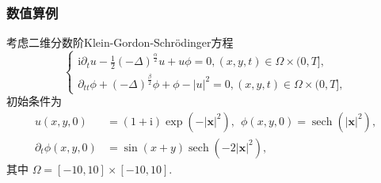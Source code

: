 \documentclass[aspectratio=169]{beamer}
\numberwithin{theorem}{section} %
\begin{document}
\begin{frame}\frametitle{数值算例}
	\begin{example}\label{exp_SAVRRK:4}
		考虑二维分数阶Klein-Gordon-Schr{\"o}dinger方程\cite{fuStructurepreservingAlgorithmsTwodimensional2020} 
		\begin{equation}
		\begin{cases}
		\mathrm{i} \partial_t u-\frac{1}{2}(-\Delta)^{\frac{\alpha}{2}} u+u \phi=0,(x, y, t) \in \Omega \times(0, T],\\
		\partial_{t t} \phi+(-\Delta)^{\frac{\beta}{2}} \phi+\phi-|u|^2=0, (x, y, t) \in \Omega \times(0, T],
		\end{cases}
		\end{equation}
		初始条件为
		\begin{equation}
			\begin{aligned}
				u(x, y, 0)&=(1+\mathrm{i}) \exp \left(-|\boldsymbol{x}|^2\right),~~\phi(x, y, 0)=\operatorname{sech}\left(|\boldsymbol{x}|^2\right),\\
				\partial_t \phi(x, y, 0)&=\sin (x+y) \operatorname{sech}\left(-2|\boldsymbol{x}|^2\right),
			\end{aligned}
		\end{equation}
		其中 $\Omega=[-10,10] \times[-10,10]$.
		\end{example}
\end{frame}
\end{document}
